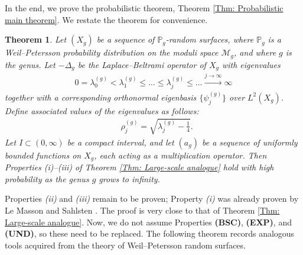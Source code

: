 \documentclass[11pt,twoside,reqno]{amsart} \usepackage{a4wide} \usepackage[T1]{fontenc} \usepackage[utf8]{inputenc} \usepackage{soul}  \usepackage{amsmath} \usepackage{amsfonts} \usepackage{amssymb} \usepackage{mathtools} \usepackage{amsthm} \usepackage{xcolor} \usepackage{graphicx} \usepackage{hyperref} \usepackage{standalone} \usepackage{esint} \usepackage{comment} \usepackage[left=2.3cm,top=3cm,right=2.3cm]{geometry} \usepackage{bm} \usepackage{svg} \usepackage{float} \numberwithin{equation}{section} \theoremstyle{plain} \newtheorem{thm}{Theorem}[section] \newtheorem{theorem}[thm]{Theorem} \newtheorem*{theorem*}{Theorem}\newtheorem{conj}[thm]{Conjecture} \newtheorem{lemma}[thm]{Lemma} \newtheorem{prop}[thm]{Proposition} \newtheorem{proposition}[thm]{Proposition} \newtheorem{cor}[thm]{Corollary} \newtheorem{question}[thm]{Question} \newtheorem{corollary}[thm]{Corollary} \newtheorem{assumption}[thm]{Assumption} \theoremstyle{definition} \newtheorem{defn}[thm]{Definition} \newtheorem{choice}[thm]{Choice} \newtheorem{definition}[thm]{Definition} \newtheorem{ex}[thm]{Example} \newtheorem{notation}[thm]{Notation} \newtheorem*{ack}{Acknowledgements} \theoremstyle{remark} \newtheorem{remark}[thm]{Remark} \newtheorem{bigremark}[thm]{Remark} \usepackage{xcolor} \newcommand{\red}[1]{ {\color{Red}#1} } \newcommand{\blue}[1]{ {\color{Blue}#1} } \author{Kai Hippi} \address{Aalto University, Espoo, Finland} \email{kai.hippi@aalto.fi}
\begin{document}
In the end, we prove the probabilistic theorem, Theorem \ref{Thm: Probabilistic main theorem}. We restate the theorem for convenience.

\begin{theorem*}
	
	Let $ ( X_{g} ) $ be a sequence of $ \mathbb{P}_{g} $-random surfaces, where $ \mathbb{P}_{g} $ is a Weil--Petersson probability distribution on the moduli space $ \mathcal{M}_{g} $, and where $ g $ is the genus. Let $-\Delta_{g}$ be the Laplace--Beltrami operator of $ X_{g} $ with eigenvalues 
	\begin{align*}
		0 = \lambda_{0}^{( g )} < \lambda_{1}^{( g )} \leq \dots \leq \lambda_{j}^{( g )} \leq \dots \xrightarrow{j \to \infty} \infty
	\end{align*}
	together with a corresponding orthonormal eigenbasis $ \{ \psi_{j}^{( g )} \} $ over $ L^{2}( X_{g} ) $. Define associated values of the eigenvalues as follows:
	\begin{align*}
		&
		\rho_{j}^{( g )} = \sqrt{ \lambda_{j}^{( g )} - \tfrac{1}{4} }.
	\end{align*}
	Let $ I \subset ( 0,\infty ) $ be a compact interval, and let $ ( a_{g} ) $ be a sequence of uniformly bounded functions on $ X_{g} $, each acting as a multiplication operator. Then Properties \emph{(i)}--\emph{(iii)} of Theorem \ref{Thm: Large-scale analogue} hold with high probability as the genus $ g $ grows to infinity.
	
\end{theorem*}

Properties \emph{(ii)} and \emph{(iii)} remain to be proven; Property \emph{(i)} was already proven by Le Masson and Sahlsten \cite{LS24}. The proof is very close to that of Theorem \ref{Thm: Large-scale analogue}. Now, we do not assume Properties \textbf{(BSC)}, \textbf{(EXP)}, and \textbf{(UND)}, so these need to be replaced. The following theorem records analogous tools acquired from the theory of Weil--Petersson random surfaces.
\end{document}
